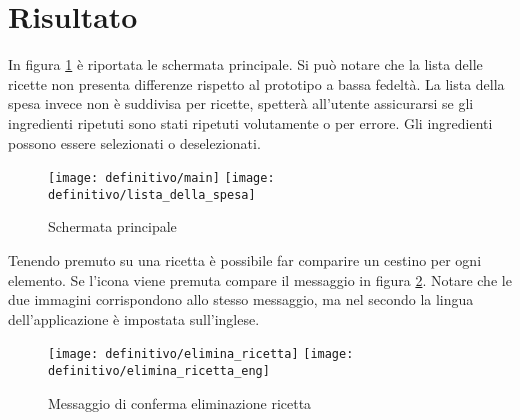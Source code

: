 



\section{Risultato}
In figura \ref{fig:def_main} è riportata le schermata principale.
Si può notare che la lista delle ricette non presenta differenze rispetto al prototipo a bassa fedeltà.
La lista della spesa invece non è suddivisa per ricette, spetterà all'utente assicurarsi se gli ingredienti ripetuti sono stati ripetuti volutamente o per errore.
Gli ingredienti possono essere selezionati o deselezionati.

\begin{figure}[ht]
  \begin{center}
    \texttt{[image: definitivo/main]}
    \texttt{[image: definitivo/lista\_della\_spesa]}
    \caption{Schermata principale}
    \label{fig:def_main}
  \end{center}
\end{figure}

Tenendo premuto su una ricetta è possibile far comparire un cestino per ogni elemento.
Se l'icona viene premuta compare il messaggio in figura \ref{fig:def_main_3}.
Notare che le due immagini corrispondono allo stesso messaggio, ma nel secondo la lingua dell'applicazione è impostata sull'inglese.

\begin{figure}[ht]
  \begin{center}
    \texttt{[image: definitivo/elimina\_ricetta]}
    \texttt{[image: definitivo/elimina\_ricetta\_eng]}
    \caption{Messaggio di conferma eliminazione ricetta}
    \label{fig:def_main_3}
  \end{center}
\end{figure}

